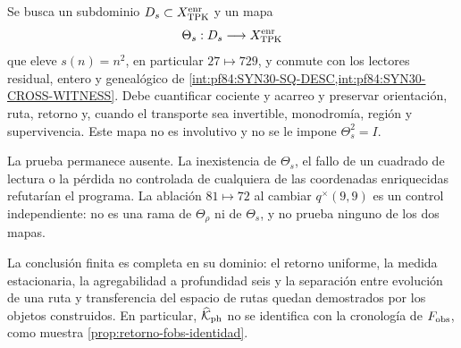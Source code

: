 \begin{criterion}
\label{pf84:SYN31-SQ-LIFT}
Se busca un subdominio \(D_s\subset X_{\rm TPK}^{\rm enr}\) y un mapa
\[
 \Theta_s:D_s\longrightarrow X_{\rm TPK}^{\rm enr}
\]
que eleve \(s(n)=n^2\), en particular \(27\mapsto729\), y conmute con los
lectores residual, entero y genealógico de
\cref{int:pf84:SYN30-SQ-DESC,int:pf84:SYN30-CROSS-WITNESS}. Debe cuantificar
cociente y acarreo y preservar orientación, ruta, retorno y, cuando el
transporte sea invertible, monodromía, región y supervivencia. Este mapa no
es involutivo y no se le impone
\(\Theta_s^2=I\).

La prueba permanece ausente. La inexistencia de \(\Theta_s\), el fallo de
un cuadrado de lectura o la pérdida no controlada de cualquiera de las
coordenadas enriquecidas refutarían el programa. La ablación
\(81\mapsto72\) al cambiar \(q^\times(9,9)\) es un control independiente:
no es una rama de \(\Theta_\rho\) ni de \(\Theta_s\), y no prueba ninguno
de los dos mapas.
\end{criterion}
\fi

La conclusión finita es completa en su dominio: el retorno uniforme, la
medida estacionaria, la agregabilidad a profundidad seis y la separación
entre evolución de una ruta y transferencia del espacio de rutas quedan
demostrados por los objetos construidos. En particular,
\(\widehat{\mathcal K}_{\rm ph}\) no se identifica con la cronología de
\(F_{\rm obs}\), como muestra \cref{prop:retorno-fobs-identidad}.
